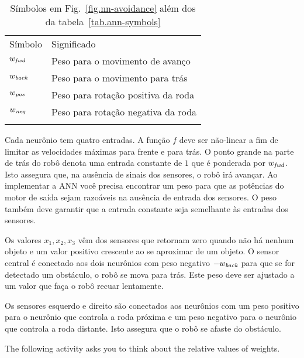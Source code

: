 \begin{table}
\caption{Símbolos em Fig.~\ref{fig.nn-avoidance} além dos da tabela~\ref{tab.ann-symbols}}
\label{tab.obstacle-avoidance}
\begin{tabular}{p{2cm}p{5.5cm}}
\hline\noalign{\smallskip}
Símbolo & Significado \\
\noalign{\smallskip}\hline\noalign{\smallskip}
$w_{\textit{\scriptsize fwd}}$ & Peso para o movimento de avanço\\
$w_{\textit{\scriptsize back}}$ & Peso para o movimento para trás\\
$w_{\textit{\scriptsize pos}}$ & Peso para rotação positiva da roda\\
$w_{\textit{\scriptsize neg}}$ & Peso para rotação negativa da roda\\
\noalign{\smallskip}\hline\noalign{\smallskip}
\end{tabular}
\end{table}

Cada neurônio tem quatro entradas. A função $f$ deve ser não-linear a fim de limitar as velocidades máximas para frente e para trás. O ponto grande na parte de trás do robô denota uma entrada constante de $1$ que é ponderada por $w_{\textit{\scriptsize fwd}}$. Isto assegura que, na ausência de sinais dos sensores, o robô irá avançar. Ao implementar a ANN você precisa encontrar um peso para que as potências do motor de saída sejam razoáveis na ausência de entrada dos sensores. O peso também deve garantir que a entrada constante seja semelhante às entradas dos sensores.

Os valores $x_1, x_2, x_3$ vêm dos sensores que retornam zero quando não há nenhum objeto e um valor positivo crescente ao se aproximar de um objeto. O sensor central é conectado aos dois neurônios com peso negativo $-w_{\textit{\scriptsize back}}$ para que se for detectado um obstáculo, o robô se mova para trás. Este peso deve ser ajustado a um valor que faça o robô recuar lentamente.

Os sensores esquerdo e direito são conectados aos neurônios com um peso positivo para o neurônio que controla a roda próxima e um peso negativo para o neurônio que controla a roda distante. Isto assegura que o robô se afaste do obstáculo.

The following activity asks you to think about the relative values of weights.

